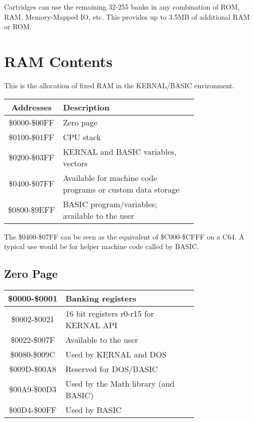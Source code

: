 Cartridges can use the remaining 32-255 banks in any combination of ROM, RAM,
Memory-Mapped IO, etc.  This provides up to 3.5MB of additional RAM or ROM.\\

\section{RAM Contents}

This is the allocation of fixed RAM in the KERNAL/BASIC environment.\\

\begin{tabular}{|c|p{0.75\linewidth}|}
	\hline
	{\bfseries Addresses} & {\bfseries Description}\\ \hline
	\$0000-\$00FF & Zero page\\ \hline
	\$0100-\$01FF & CPU stack\\ \hline
	\$0200-\$03FF & KERNAL and BASIC variables, vectors\\ \hline
	\$0400-\$07FF & Available for machine code programs or custom data storage\\ \hline
	\$0800-\$9EFF & BASIC program/variables; available to the user\\ \hline
\end{tabular}

\vspace{16pt}

The \$0400-\$07FF can be seen as the equivalent of \$C000-\$CFFF on a C64. A
typical use would be for helper machine code called by BASIC.\\

\subsection{Zero Page}

\begin{tabular}{|c|p{0.75\linewidth}|}
	\hline
	\$0000-\$0001 & Banking registers\\ \hline
	\$0002-\$0021 & 16 bit registers r0-r15 for KERNAL API\\ \hline
	\$0022-\$007F & Available to the user\\ \hline
	\$0080-\$009C & Used by KERNAL and DOS\\ \hline
	\$009D-\$00A8 & Reserved for DOS/BASIC\\ \hline
	\$00A9-\$00D3 & Used by the Math library (and BASIC)\\ \hline
	\$00D4-\$00FF & Used by BASIC\\ \hline
\end{tabular}


